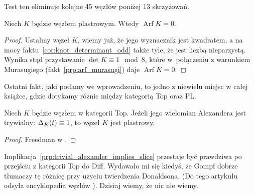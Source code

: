 Test ten eliminuje kolejne 45 węzłów poniżej 13 skrzyżowań.

\begin{proposition}
    Niech $K$ będzie węzłem plastrowym.
    Wtedy $\operatorname{Arf} K = 0$.
\end{proposition}

\begin{proof}
    Ustalmy węzeł $K$, wiemy już, że jego wyznacznik jest kwadratem, a na mocy faktu~\ref{cor:knot_determinant_odd} także tyle, że jest liczbą nieparzystą.
    Wynika stąd przystawanie $\det K \equiv 1 \mod 8$, które w~połączeniu z warunkiem Murasugiego (fakt~\ref{prp:arf_murasugi}) daje $\operatorname{Arf} K = 0$.
\end{proof}


Ostatni fakt, jaki podamy we wprowadzeniu, to jedno z niewielu miejsc w całej książce, gdzie dotykamy różnic między kategorią Top oraz PL.

\begin{proposition}
\label{prp:trivial_alexander_implies_slice}%
    Niech $K$ będzie węzłem w kategorii Top.
    Jeżeli jego wielomian Alexandera jest trywialny: $\Delta_K(t) \equiv 1$, to węzeł $K$ jest plastrowy.
\end{proposition}

\begin{proof}
%
    Freedman w \cite[tw. 1.13]{freedman82}.
\end{proof}

Implikacja~\ref{prp:trivial_alexander_implies_slice} przestaje być prawdziwa po przejściu z kategorii Top do Diff.
Wydawało mi się kiedyś, że Gompf \cite{gompf86} dobrze tłumaczy tę różnicę przy użyciu twierdzenia Donaldsona.
%
%
(Do tego artykułu odsyła encyklopedia węzłów \cite{adams21}).
Dzisiaj wiemy, że nic nie wiemy.









